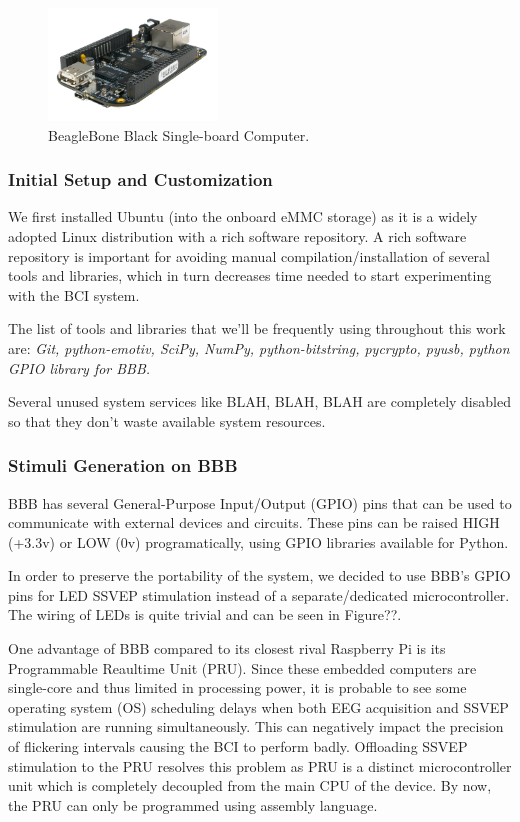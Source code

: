 \documentclass[12pt]{article}
\newcommand\mysubsubsection[1]{\subsubsection{#1}}
\numberwithin{equation}{section}
\numberwithin{figure}{section}
\numberwithin{table}{section}
\begin{document}
\begin{figure}[ht]
    \centering
    \includegraphics[width=0.4\textwidth]{images/bbb}
    \caption{BeagleBone Black Single-board Computer.}
    \label{fig:bbb}
\end{figure}

\mysubsubsection{Initial Setup and Customization}\label{seq:embeddedcomputer_initialsetup}
\par{
We first installed Ubuntu (into the onboard eMMC storage) as it is a widely adopted Linux distribution with a rich software repository. A rich software repository is important for avoiding 
manual compilation/installation of several tools and libraries, which in turn decreases time needed to start experimenting with the BCI system.
}

\par{
The list of tools and libraries that we'll be frequently using throughout this work are: {\em Git, python-emotiv, SciPy, NumPy, python-bitstring, pycrypto, pyusb, python GPIO library for BBB.}
}

\par{
Several unused system services like BLAH, BLAH, BLAH are completely disabled so that they don't waste available system resources.
}

\mysubsubsection{Stimuli Generation on BBB}\label{seq:embeddedcomputer_stimuligen}
\par{
    BBB has several General-Purpose Input/Output (GPIO) pins that can be used 
    to communicate with external devices and circuits. These pins can be raised 
    HIGH (+3.3v) or LOW (0v) programatically, using GPIO libraries available for 
    Python.
}
\par{
    In order to preserve the portability of the system, we decided to use BBB's 
    GPIO pins for LED SSVEP stimulation instead of a separate/dedicated microcontroller. 
    The wiring of LEDs is quite trivial and can be seen in Figure??.
}


\par{
    One advantage of BBB compared to its closest rival Raspberry Pi is its Programmable 
    Reaultime Unit (PRU). Since these embedded computers are single-core and thus 
    limited in processing power, it is probable to see some operating system (OS) scheduling delays when 
    both EEG acquisition and SSVEP stimulation are running simultaneously. This can negatively 
    impact the precision of flickering intervals causing the BCI to perform badly. Offloading SSVEP 
    stimulation to the PRU resolves this problem as PRU is a distinct microcontroller unit which is 
    completely decoupled from the main CPU of the device. By now, the PRU can only be programmed using 
    assembly language.
}
\end{document}
